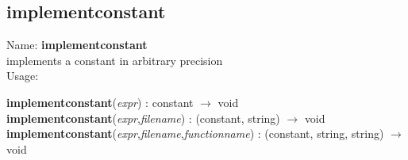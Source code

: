 \subsection{implementconstant}
\label{labimplementconstant}
\noindent Name: \textbf{implementconstant}\\
implements a constant in arbitrary precision\\
\noindent Usage: 
\begin{center}
\textbf{implementconstant}(\emph{expr}) : \textsf{constant} $\rightarrow$ \textsf{void}\\
\textbf{implementconstant}(\emph{expr},\emph{filename}) : (\textsf{constant}, \textsf{string}) $\rightarrow$ \textsf{void}\\
\textbf{implementconstant}(\emph{expr},\emph{filename},\emph{functionname}) : (\textsf{constant}, \textsf{string}, \textsf{string}) $\rightarrow$ \textsf{void}\\
\end{center}
